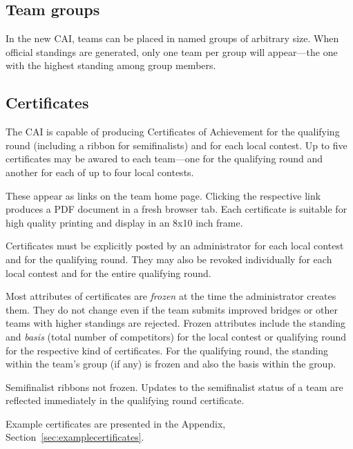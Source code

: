 \documentclass[11pt,letterpaper]{refart}
\begin{document}
\subsection{Team groups}
In the new CAI, teams can be placed in named groups of arbitrary size. When
official standings are generated, only one team per group will appear---the
one with the highest standing among group members.

\subsection{Certificates}
\label{sec:certificates}
The CAI is capable of producing Certificates of Achievement for the
qualifying round (including a ribbon for semifinalists) and for each local contest.
Up to five certificates may be awared to each team---one for the qualifying round
and another for each of up to four local contests.

These appear as links on the team home page. Clicking the respective link
produces a PDF document in a fresh browser tab. Each certificate is suitable 
for high quality printing and display in an 8x10 inch frame. 

Certificates must be explicitly posted by an 
administrator for each local contest and for the qualifying round. They may also 
be revoked individually for each local contest and for the entire qualifying round. 

Most attributes of certificates are \emph{frozen} at the time the administrator creates
them. They do not change even if the team submits improved bridges or other
teams with higher standings are rejected. Frozen attributes include the standing 
and \emph{basis} (total number of competitors) for the local contest or qualifying round 
for the respective kind of certificates. For the qualifying round, the standing within 
the team's group (if any) is frozen and also the basis within the group.

Semifinalist ribbons not frozen. Updates to the semifinalist status of a team are 
reflected immediately in the qualifying round certificate.

Example certificates are presented in the Appendix, Section~\ref{sec:examplecertificates}.
\end{document}
